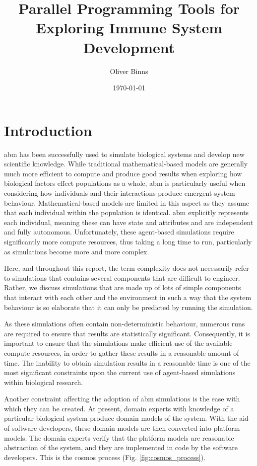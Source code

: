 \documentclass{UoYCSproject}
\title{Parallel Programming Tools for Exploring Immune System Development}
\author{Oliver Binns}
\date{\today}
\begin{document}
\maketitle
\listoffigures
\listoftables
\printglossary[type=\acronymtype]
\printglossary


\chapter{Introduction}
\gls{abm} has been successfully used to simulate biological systems and develop new scientific knowledge\cite{kieran_thesis, flame_keratinocyte}.
While traditional mathematical-based models are generally much more efficient to compute and produce good results when exploring how biological factors effect populations as a whole, \gls{abm} is particularly useful when considering how individuals and their interactions produce emergent system behaviour.
Mathematical-based models are limited in this aspect as they assume that each individual within the population is identical.
\gls{abm} explicitly represents each individual, meaning these can have state and attributes and are independent and fully autonomous.
Unfortunately, these agent-based simulations require significantly more compute resources, thus taking a long time to run, particularly as simulations become more and more complex.

Here, and throughout this report, the term complexity does not necessarily refer to simulations that contains several components that are difficult to engineer.
Rather, we discuss simulations that are made up of lots of simple components that interact with each other and the environment in such a way that the system behaviour is so elaborate that it can only be predicted by running the simulation.

As these simulations often contain non-deterministic behaviour, numerous runs are required to ensure that results are statistically significant.
Consequently, it is important to ensure that the simulations make efficient use of the available compute resources, in order to gather these results in a reasonable amount of time.
The inability to obtain simulation results in a reasonable time is one of the most significant constraints upon the current use of agent-based simulations within biological research.

Another constraint affecting the adoption of \gls{abm} simulations is the ease with which they can be created.
At present, domain experts with knowledge of a particular biological system produce domain models of the system.
With the aid of software developers, these domain models are then converted into platform models.
The domain experts verify that the platform models are reasonable abstraction of the system, and they are implemented in code by the software developers.
This is the \gls{cosmos} process (Fig. \ref{fig:cosmos_process}).
\end{document}
